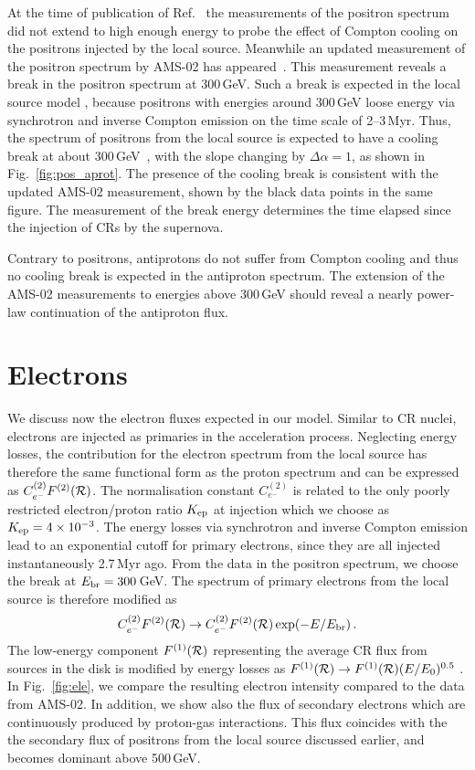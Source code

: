 \documentclass[prd,aps,twocolumn]{revtex4}
\def\R{{\cal R}}
\begin{document}
At the time of publication of Ref.~\cite{PRL} the measurements of the positron 
spectrum did not extend to high enough energy to probe the effect of Compton 
cooling on the positrons injected by the local source. Meanwhile an updated 
measurement of the positron spectrum by AMS-02 has appeared~\cite{AMS02new}. 
This measurement reveals a break in the positron spectrum at 300\,GeV. Such 
a break is expected in the local source model \cite{PRL}, because positrons 
with energies around 300\,GeV loose energy via synchrotron and inverse Compton 
emission  on the time scale of 2--3\,Myr. Thus, the spectrum of positrons 
from the local source is expected to have a cooling break at about 
300\,GeV~\cite{PRL}, with the slope changing by $\Delta\alpha=1$, 
as shown in Fig.~\ref{fig:pos_aprot}. The presence of the 
cooling break is consistent with the updated AMS-02 measurement, shown by the 
black data points in the same figure. The measurement of the break energy 
determines the time elapsed since the injection of CRs by the supernova. 


Contrary to positrons, antiprotons do not suffer from Compton cooling and
thus no cooling break is expected in the antiproton spectrum. The extension 
of the AMS-02 measurements to energies above 300\,GeV should reveal a nearly 
power-law continuation of the antiproton flux. 



\section{Electrons}


We discuss now the electron fluxes expected in our model. Similar to CR
nuclei, electrons are injected as primaries in the acceleration process.
Neglecting energy losses, the contribution for the electron spectrum from
the local source has therefore the same functional form as the proton
spectrum and can be expressed as $C^{(2)}_{e^-}F^{(2)}(\R)$. The normalisation
constant $C^{(2)}_{e^-}$ is related to the only poorly restricted
electron/proton ratio $K_{\rm ep}$ at injection which we choose as
$K_{\rm ep}=4\times 10^{-3}$.  The energy losses via synchrotron and inverse
Compton emission lead to an exponential cutoff for primary electrons,
since they are all injected instantaneously 2.7\,Myr ago. From the data in
the positron spectrum, we choose the  break at $E_{\rm br}=300$\,GeV. The
spectrum of primary electrons from the local source is therefore modified as
%
$$
C^{(2)}_{e^-}F^{(2)}(\R) \to  C^{(2)}_{e^-}F^{(2)}(\R) \exp(-E/E_{\rm br}) \,.
$$
%
The low-energy component $F^{(1)}(\R)$ representing
the average CR flux from sources in the disk is modified by energy losses as
$F^{(1)}(\R) \to  F^{(1)}(\R)(E/E_0)^{0.5}$ \cite{panov}.
%
In Fig.~\ref{fig:ele}, we compare the resulting electron intensity compared
to the data from AMS-02. In addition, we show also the flux of secondary
electrons which are continuously produced by proton-gas interactions. This
flux coincides with the the secondary flux of positrons from the local source
discussed earlier, and becomes dominant above 500\,GeV.
  
\end{document}
